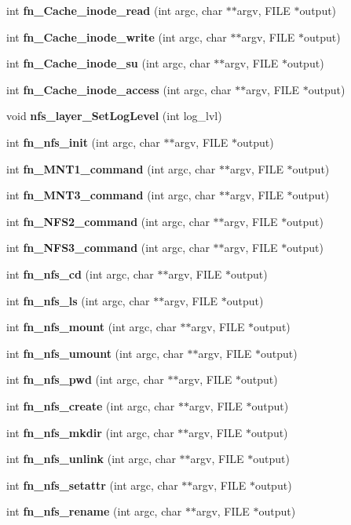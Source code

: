 \begin{DoxyCompactItemize}
int {\bf fn\_\-Cache\_\-inode\_\-read} (int argc, char $\ast$$\ast$argv, FILE $\ast$output)
\item 
int {\bf fn\_\-Cache\_\-inode\_\-write} (int argc, char $\ast$$\ast$argv, FILE $\ast$output)
\item 
int {\bf fn\_\-Cache\_\-inode\_\-su} (int argc, char $\ast$$\ast$argv, FILE $\ast$output)
\item 
int {\bf fn\_\-Cache\_\-inode\_\-access} (int argc, char $\ast$$\ast$argv, FILE $\ast$output)
\item 
void {\bf nfs\_\-layer\_\-SetLogLevel} (int log\_\-lvl)
\item 
int {\bf fn\_\-nfs\_\-init} (int argc, char $\ast$$\ast$argv, FILE $\ast$output)
\item 
int {\bf fn\_\-MNT1\_\-command} (int argc, char $\ast$$\ast$argv, FILE $\ast$output)
\item 
int {\bf fn\_\-MNT3\_\-command} (int argc, char $\ast$$\ast$argv, FILE $\ast$output)
\item 
int {\bf fn\_\-NFS2\_\-command} (int argc, char $\ast$$\ast$argv, FILE $\ast$output)
\item 
int {\bf fn\_\-NFS3\_\-command} (int argc, char $\ast$$\ast$argv, FILE $\ast$output)
\item 
int {\bf fn\_\-nfs\_\-cd} (int argc, char $\ast$$\ast$argv, FILE $\ast$output)
\item 
int {\bf fn\_\-nfs\_\-ls} (int argc, char $\ast$$\ast$argv, FILE $\ast$output)
\item 
int {\bf fn\_\-nfs\_\-mount} (int argc, char $\ast$$\ast$argv, FILE $\ast$output)
\item 
int {\bf fn\_\-nfs\_\-umount} (int argc, char $\ast$$\ast$argv, FILE $\ast$output)
\item 
int {\bf fn\_\-nfs\_\-pwd} (int argc, char $\ast$$\ast$argv, FILE $\ast$output)
\item 
int {\bf fn\_\-nfs\_\-create} (int argc, char $\ast$$\ast$argv, FILE $\ast$output)
\item 
int {\bf fn\_\-nfs\_\-mkdir} (int argc, char $\ast$$\ast$argv, FILE $\ast$output)
\item 
int {\bf fn\_\-nfs\_\-unlink} (int argc, char $\ast$$\ast$argv, FILE $\ast$output)
\item 
int {\bf fn\_\-nfs\_\-setattr} (int argc, char $\ast$$\ast$argv, FILE $\ast$output)
\item 
int {\bf fn\_\-nfs\_\-rename} (int argc, char $\ast$$\ast$argv, FILE $\ast$output)
\item 
$$
\end{DoxyCompactItemize}

